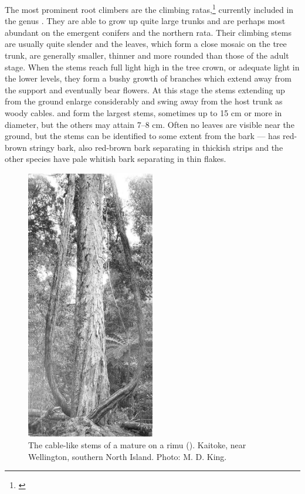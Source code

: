 The most prominent root climbers are the climbing ratas,\footnote{\cite{dawson1967growth}} currently included in the genus .
They are able to grow up quite large trunks and are perhaps most abundant on the emergent conifers and the northern rata.
Their climbing stems are usually quite slender and the leaves, which form a close mosaic on the tree trunk, are generally smaller, thinner and more rounded than those of the adult stage.
When the stems reach full light high in the tree crown, or adequate light in the lower levels, they form a bushy growth of branches which extend away from the support and eventually bear flowers.
At this stage the stems extending up from the ground enlarge considerably and swing away from the host trunk as woody cables.  and  form the largest stems, sometimes up to 15 cm or more in diameter, but the others may attain 7--8 cm.
Often no leaves are visible near the ground, but the stems can be identified to some extent from the bark ---  has red-brown stringy bark,  also red-brown bark separating in thickish strips and the other species have pale whitish bark separating in thin flakes.

\begin{figure}
	\includegraphics[width=0.5\textwidth]{graphics/figure31perforata.jpg}
	\centering
	\caption[A mature \emph{Metrosideros perforata} on a rimu]{The cable-like stems of a mature  on a rimu (). Kaitoke, near Wellington, southern North Island. Photo: M. D. King.}%
	\label{fig:31perforata}
\end{figure}

